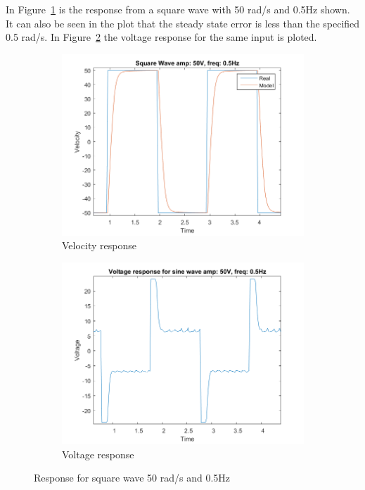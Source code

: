 \documentclass[12pt,a4paper]{article}
\begin{document}
In Figure~\ref{fig:T2_a50_f05:a} is the response from a square wave with
50 rad/s and 0.5Hz shown. It can also be seen in the plot that the
steady state error is less than the specified 0.5 rad/s. In
Figure~\ref{fig:T2_a50_f05:b} the voltage response for the same input is
ploted.
\begin{figure}[H]
  \centering
  \begin{subfigure}[b]{0.45\linewidth}
    \includegraphics[width=\linewidth]{T2_a50_f05.png}
    \caption{Velocity response }
    \label{fig:T2_a50_f05:a}
  \end{subfigure}
  \begin{subfigure}[b]{0.45\linewidth}
    \includegraphics[width=\linewidth]{T2_V_a50_f05.png}
    \caption{Voltage response }
    \label{fig:T2_a50_f05:b}
  \end{subfigure}
  \caption{Response for square wave 50 rad/s and 0.5Hz}
  \label{fig:T2_a50_f05}
\end{figure}
\end{document}
